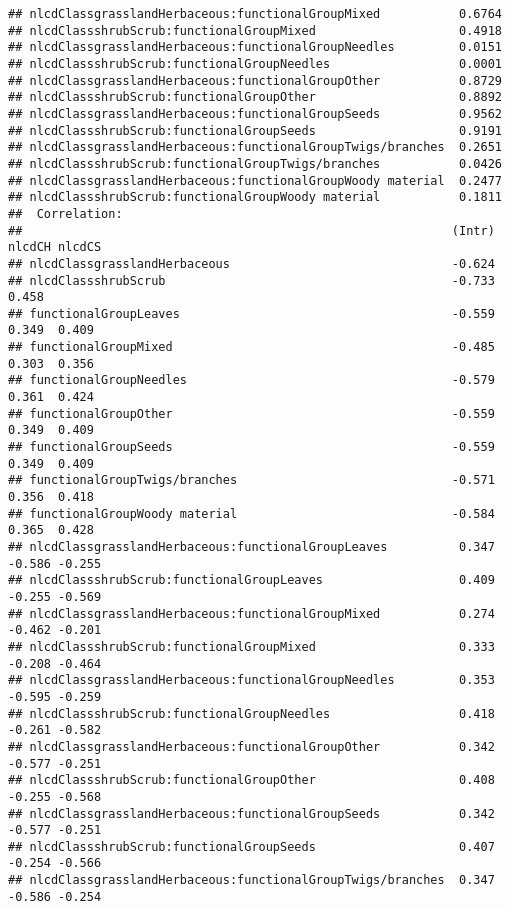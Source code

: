 \documentclass[]{article}
\begin{document}
\begin{verbatim}
## nlcdClassgrasslandHerbaceous:functionalGroupMixed           0.6764
## nlcdClassshrubScrub:functionalGroupMixed                    0.4918
## nlcdClassgrasslandHerbaceous:functionalGroupNeedles         0.0151
## nlcdClassshrubScrub:functionalGroupNeedles                  0.0001
## nlcdClassgrasslandHerbaceous:functionalGroupOther           0.8729
## nlcdClassshrubScrub:functionalGroupOther                    0.8892
## nlcdClassgrasslandHerbaceous:functionalGroupSeeds           0.9562
## nlcdClassshrubScrub:functionalGroupSeeds                    0.9191
## nlcdClassgrasslandHerbaceous:functionalGroupTwigs/branches  0.2651
## nlcdClassshrubScrub:functionalGroupTwigs/branches           0.0426
## nlcdClassgrasslandHerbaceous:functionalGroupWoody material  0.2477
## nlcdClassshrubScrub:functionalGroupWoody material           0.1811
##  Correlation: 
##                                                            (Intr) nlcdCH nlcdCS
## nlcdClassgrasslandHerbaceous                               -0.624              
## nlcdClassshrubScrub                                        -0.733  0.458       
## functionalGroupLeaves                                      -0.559  0.349  0.409
## functionalGroupMixed                                       -0.485  0.303  0.356
## functionalGroupNeedles                                     -0.579  0.361  0.424
## functionalGroupOther                                       -0.559  0.349  0.409
## functionalGroupSeeds                                       -0.559  0.349  0.409
## functionalGroupTwigs/branches                              -0.571  0.356  0.418
## functionalGroupWoody material                              -0.584  0.365  0.428
## nlcdClassgrasslandHerbaceous:functionalGroupLeaves          0.347 -0.586 -0.255
## nlcdClassshrubScrub:functionalGroupLeaves                   0.409 -0.255 -0.569
## nlcdClassgrasslandHerbaceous:functionalGroupMixed           0.274 -0.462 -0.201
## nlcdClassshrubScrub:functionalGroupMixed                    0.333 -0.208 -0.464
## nlcdClassgrasslandHerbaceous:functionalGroupNeedles         0.353 -0.595 -0.259
## nlcdClassshrubScrub:functionalGroupNeedles                  0.418 -0.261 -0.582
## nlcdClassgrasslandHerbaceous:functionalGroupOther           0.342 -0.577 -0.251
## nlcdClassshrubScrub:functionalGroupOther                    0.408 -0.255 -0.568
## nlcdClassgrasslandHerbaceous:functionalGroupSeeds           0.342 -0.577 -0.251
## nlcdClassshrubScrub:functionalGroupSeeds                    0.407 -0.254 -0.566
## nlcdClassgrasslandHerbaceous:functionalGroupTwigs/branches  0.347 -0.586 -0.254

\end{verbatim}
\end{document}
